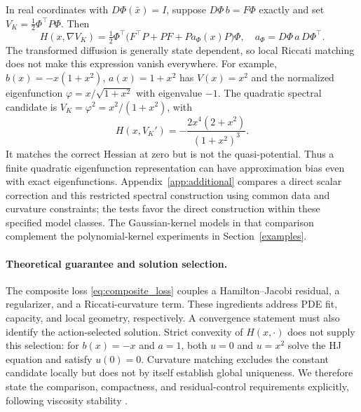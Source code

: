 \documentclass[11pt]{article}
\theoremstyle{plain}      %
\theoremstyle{definition} %
\begin{document}
In real coordinates with $D\Phi(\bar x)=I$, suppose $D\Phi\,b=F\Phi$ exactly and set $V_K=\tfrac12\Phi^\top P\Phi$. Then
\begin{equation}\label{eq:transformed-diffusion}
 H(x,\nabla V_K)=\tfrac12\Phi^\top
 \bigl(F^\top P+PF+P a_\Phi(x)P\bigr)\Phi,
 \quad a_\Phi=D\Phi\,a\,D\Phi^\top.
\end{equation}
The transformed diffusion is generally state dependent, so local Riccati matching does not make this expression vanish everywhere. For example, $b(x)=-x(1+x^2)$, $a(x)=1+x^2$ has $V(x)=x^2$ and the normalized eigenfunction $\varphi=x/\sqrt{1+x^2}$ with eigenvalue $-1$. The quadratic spectral candidate is $V_K=\varphi^2=x^2/(1+x^2)$, with
\[
 H(x,V_K')=-\frac{2x^4(2+x^2)}{(1+x^2)^3}.
\]
It matches the correct Hessian at zero but is not the quasi-potential. Thus a finite quadratic eigenfunction representation can have approximation bias even with exact eigenfunctions. Appendix~\ref{app:additional} compares a direct scalar correction and this restricted spectral construction using common data and curvature constraints; the tests favor the direct construction within these specified model classes. The Gaussian-kernel models in that comparison complement the polynomial-kernel experiments in Section~\ref{examples}.

\paragraph{Theoretical guarantee and solution selection.}\label{sec:solution-selection}
The composite loss \eqref{eq:composite_loss} couples a Hamilton--Jacobi residual, a regularizer, and a Riccati-curvature term. These ingredients address PDE fit, capacity, and local geometry, respectively. A convergence statement must also identify the action-selected solution. Strict convexity of $H(x,\cdot)$ does not supply this selection: for $b(x)=-x$ and $a=1$, both $u=0$ and $u=x^2$ solve the HJ equation and satisfy $u(0)=0$. Curvature matching excludes the constant candidate locally but does not by itself establish global uniqueness. We therefore state the comparison, compactness, and residual-control requirements explicitly, following viscosity stability \cite{Crandall1992}.
\end{document}
